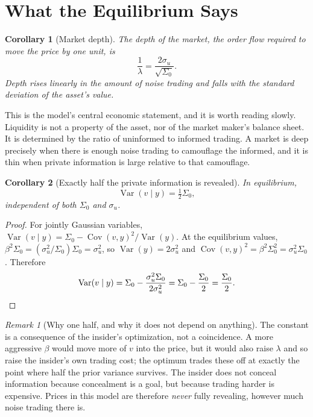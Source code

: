 \documentclass[11pt]{article}
\newtheorem{corollary}{Corollary}
\theoremstyle{remark}
\newtheorem*{remark}{Remark}
\theoremstyle{definition}
\begin{document}
\section{What the Equilibrium Says}
\label{sec:consequences}

\begin{corollary}[Market depth]
\label{cor:depth}
The depth of the market, the order flow required to move the price by one unit, is
\begin{equation*}
\frac{1}{\lambda} = \frac{2\sigma_u}{\sqrt{\Sigma_0}} .
\end{equation*}
Depth rises linearly in the amount of noise trading and falls with the standard deviation of the asset's value.
\end{corollary}

This is the model's central economic statement, and it is worth reading slowly. Liquidity is not a property of the asset, nor of the market maker's balance sheet. It is determined by the ratio of uninformed to informed trading. A market is deep precisely when there is enough noise trading to camouflage the informed, and it is thin when private information is large relative to that camouflage.

\begin{corollary}[Exactly half the private information is revealed]
\label{cor:half}
In equilibrium,
\begin{equation*}
\operatorname{Var}(v \mid y) = \tfrac12\Sigma_0 ,
\end{equation*}
independent of both $\Sigma_0$ and $\sigma_u$.
\end{corollary}

\begin{proof}
For jointly Gaussian variables, $\operatorname{Var}(v\mid y) = \Sigma_0 - \operatorname{Cov}(v,y)^2/\operatorname{Var}(y)$. At the equilibrium values, $\beta^2\Sigma_0 = (\sigma_u^2/\Sigma_0)\Sigma_0 = \sigma_u^2$, so $\operatorname{Var}(y) = 2\sigma_u^2$ and $\operatorname{Cov}(v,y)^2 = \beta^2\Sigma_0^2 = \sigma_u^2\Sigma_0$. Therefore
\begin{equation*}
\operatorname{Var}(v\mid y) = \Sigma_0 - \frac{\sigma_u^2\Sigma_0}{2\sigma_u^2} = \Sigma_0 - \frac{\Sigma_0}{2} = \frac{\Sigma_0}{2}. \qedhere
\end{equation*}
\end{proof}

\begin{remark}[Why one half, and why it does not depend on anything]
\label{rem:half}
The constant is a consequence of the insider's optimization, not a coincidence. A more aggressive $\beta$ would move more of $v$ into the price, but it would also raise $\lambda$ and so raise the insider's own trading cost; the optimum trades these off at exactly the point where half the prior variance survives. The insider does not conceal information because concealment is a goal, but because trading harder is expensive. Prices in this model are therefore \emph{never} fully revealing, however much noise trading there is.
\end{remark}
\end{document}
